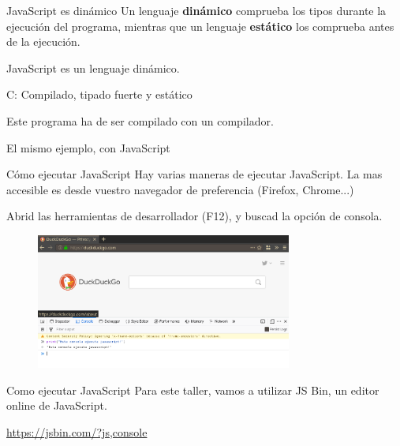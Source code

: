 \documentclass{beamer}
\begin{document}
    
    
\begin{frame}{JavaScript es dinámico}
        \pause
        Un lenguaje \textbf{dinámico} comprueba los tipos durante la ejecución del programa, mientras que un lenguaje \textbf{estático} los comprueba antes de la ejecución.\pause
        \centering
        
        JavaScript es un lenguaje dinámico.
\end{frame}
\begin{frame}[fragile]{C: Compilado, tipado fuerte y estático}\pause
        \centering
        
        Este programa ha de ser compilado con un compilador.
\end{frame}

\begin{frame}[fragile]{El mismo ejemplo, con JavaScript}\pause
        \centering
\end{frame}

\begin{frame}{Cómo ejecutar JavaScript}\pause
    Hay varias maneras de ejecutar JavaScript. La mas accesible es desde vuestro navegador de preferencia (Firefox, Chrome...)\pause
    
    Abrid las herramientas de desarrollador (F12), y buscad la opción de consola.
    \begin{figure}
        \centering
        \includegraphics[width=0.75\textwidth]{images/firefox_dev.png}
    \end{figure}
\end{frame}

\begin{frame}{Como ejecutar JavaScript}
Para este taller, vamos a utilizar JS Bin, un editor online de JavaScript.
    
\centering\url{https://jsbin.com/?js,console}
\end{frame}
\end{document}

